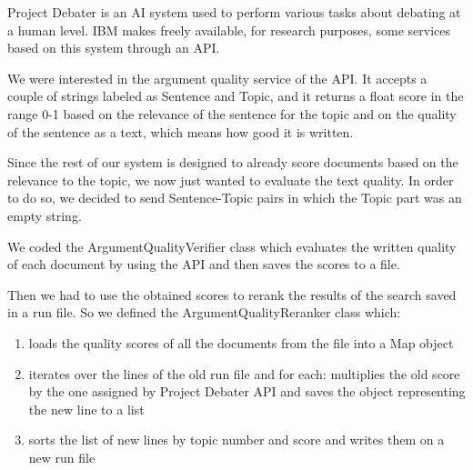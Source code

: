      Project Debater is an AI system used to perform various tasks about debating at a human level. IBM makes freely available, for research purposes, some services based on this system through an API. \citep{ProjectDebaterAPI}
      
      We were interested in the argument quality service of the API. It accepts a couple of strings labeled as Sentence and Topic, and it returns a float score in the range 0-1 based on the relevance of the sentence for the topic and on the quality of the sentence as a text, which means how good it is written. 
      
      Since the rest of our system is designed to already score documents based on the relevance to the topic, we now just wanted to evaluate the text quality. In order to do so, we decided to send Sentence-Topic pairs in which the Topic part was an empty string.
      
      We coded the ArgumentQualityVerifier class which evaluates the written quality of each document by using the API and then saves the scores to a file.
      
      Then we had to use the obtained scores to rerank the results of the search saved in a run file. So we defined the ArgumentQualityReranker class which:
      
       \begin{enumerate} 
           \item loads the quality scores of all the documents from the file into a Map object \item iterates over the lines of the old run file and for each: multiplies the old score by the one assigned by Project Debater API and saves the object representing the new line to a list \item sorts the list of new lines by topic number and score and writes them on a new run file 
       \end{enumerate}